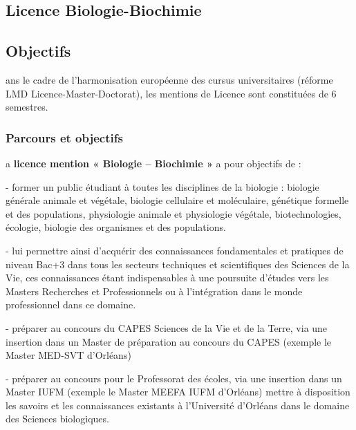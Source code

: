 \documentclass[10pt, a5paper]{report}
\begin{document}
\begin{spacing}{1.5}

\chapter*{Licence Biologie-Biochimie}

\footnotesize
\section*{Objectifs}



ans le cadre de l’harmonisation européenne des cursus universitaires (réforme LMD Licence-Master-Doctorat), les mentions de  Licence sont constituées de 6 semestres.

\subsection*{Parcours et objectifs}

a \textbf{licence mention « Biologie – Biochimie »} a pour objectifs de : 

- former un public étudiant à toutes les disciplines de la biologie : biologie générale animale et végétale, biologie cellulaire et moléculaire, génétique formelle et des populations, physiologie animale et physiologie végétale, biotechnologies, écologie, biologie des organismes et des populations.

- lui permettre ainsi d’acquérir des connaissances fondamentales et pratiques de niveau Bac+3 dans tous les secteurs techniques et scientifiques des Sciences de la Vie, ces connaissances étant indispensables à une poursuite d’études vers les Masters Recherches et Professionnels ou à l’intégration dans le monde professionnel dans ce domaine.

- préparer au concours du CAPES Sciences de la Vie et de la Terre, via une insertion dans un Master de préparation au concours du CAPES (exemple le Master MED-SVT d’Orléans)

- préparer au concours pour le Professorat des écoles, via une insertion dans un Master IUFM (exemple le Master MEEFA IUFM d’Orléans) mettre à disposition les savoirs et les connaissances existants à l’Université d’Orléans dans le domaine des Sciences biologiques.
\newline


\end{spacing}
\end{document}
